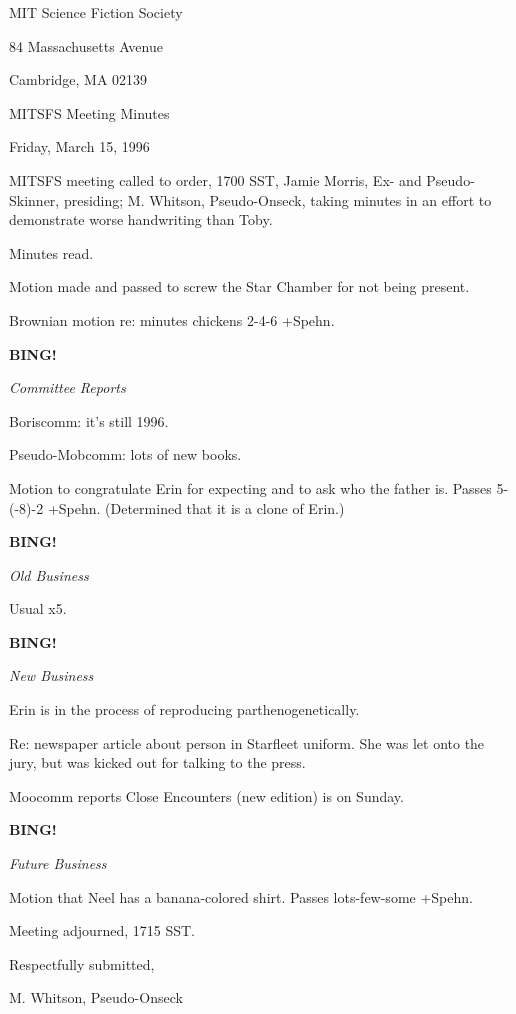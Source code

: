 \documentclass[12pt]{article}
\newcommand{\bing}{{\bf BING!} }
\newcommand{\goto}[1]{\bing \vskip 12pt \centerline{{\em{#1}}}}
\begin{document}
\begin{center}

MIT Science Fiction Society 

84 Massachusetts Avenue

Cambridge, MA 02139

\vspace{12pt}

MITSFS Meeting Minutes 

Friday, March 15, 1996

\end{center}
 
\vspace{18pt}

\setlength{\parskip}{6pt}

\noindent
MITSFS meeting called to order, 1700 SST,
Jamie Morris, Ex- and Pseudo-Skinner, presiding; M. Whitson, Pseudo-Onseck, taking minutes in an effort to demonstrate worse handwriting than Toby.

Minutes read.

Motion made and passed to screw the Star Chamber for not being present.

Brownian motion re: minutes chickens 2-4-6 +Spehn.

\goto{Committee Reports}

Boriscomm: it's still 1996.

Pseudo-Mobcomm: lots of new books.

Motion to congratulate Erin for expecting and to ask who the father is. Passes 5-(-8)-2 +Spehn. (Determined that it is a clone of Erin.)

\goto{Old Business}

Usual x5.

\goto{New Business}

Erin is in the process of reproducing parthenogenetically.

Re: newspaper article about person in Starfleet uniform. She was let onto the jury, but was kicked out for talking to the press.

Moocomm reports Close Encounters (new edition) is on Sunday.

\goto{Future Business}

Motion that Neel has a banana-colored shirt. Passes lots-few-some +Spehn.

\vspace{12pt}

\noindent
Meeting adjourned, 1715 SST.

\vspace{18pt}

\centerline{Respectfully submitted,}
\centerline{M. Whitson, Pseudo-Onseck}
\end{document}
